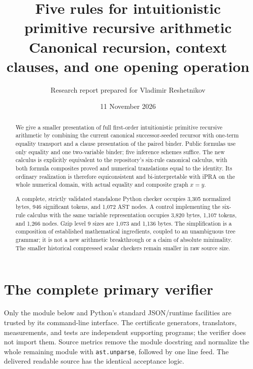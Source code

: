 \documentclass[11pt,letterpaper]{article}
\title{\textcolor{ink}{Five rules for intuitionistic\\primitive recursive arithmetic}\\[4pt]\large Canonical recursion, context clauses, and one opening operation}
\author{Research report prepared for Vladimir Reshetnikov}
\date{11 November 2026}
\theoremstyle{definition}\newtheorem{definition}[theorem]{Definition}
\newcommand{\file}[1]{\texttt{\small\nolinkurl{#1}}}
\begin{document}
\maketitle
\begin{abstract}
We give a smaller presentation of full first-order intuitionistic primitive recursive arithmetic by combining the current canonical successor-seeded recursor with one-term equality transport and a clause presentation of the paired binder. Public formulas use only equality and one two-variable binder; five inference schemes suffice. The new calculus is explicitly equivalent to the repository's six-rule canonical calculus, with both formula composites proved and numerical translations equal to the identity. Its ordinary realization is therefore equiconsistent and bi-interpretable with iPRA on the whole numerical domain, with actual equality and composite graph $x=y$.

A complete, strictly validated standalone Python checker occupies 3,305 normalized bytes, 946 significant tokens, and 1,072 AST nodes. A control implementing the six-rule calculus with the same variable representation occupies 3,820 bytes, 1,107 tokens, and 1,266 nodes. Gzip level 9 sizes are 1,073 and 1,136 bytes. The simplification is a composition of established mathematical ingredients, coupled to an unambiguous tree grammar; it is not a new arithmetic breakthrough or a claim of absolute minimality. The smaller historical compressed scalar checkers remain smaller in raw source size.
\end{abstract}
\setcounter{tocdepth}{1}
\tableofcontents
\newpage






\appendix
\section{The complete primary verifier}
Only the module below and Python's standard JSON/runtime facilities are trusted by its command-line interface. The certificate generators, translators, measurements, and tests are independent supporting programs; the verifier does not import them. Source metrics remove the module docstring and normalize the whole remaining module with \file{ast.unparse}, followed by one line feed. The delivered readable source has the identical acceptance logic.

\begingroup\small
\end{document}

